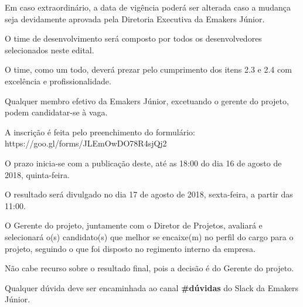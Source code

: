 	\clausula Em caso extraordinário, a data de vigência poderá ser alterada caso a mudança seja devidamente aprovada pela Diretoria Executiva da Emakers Júnior.

	

	\clausula O time de desenvolvimento será composto por todos os desenvolvedores selecionados neste edital.

	\clausula O time, como um todo, deverá prezar pelo cumprimento dos itens 2.3 e 2.4 com excelência e profissionalidade.

	

	\clausula Qualquer membro efetivo da Emakers Júnior, excetuando o gerente do projeto,  podem candidatar-se à vaga.
	
	\clausula A inscrição é feita pelo preenchimento do formulário: 
	https://goo.gl/forms/JLEmOwDO78R4sjQj2

	\clausula O prazo inicia-se com a publicação deste, até as 18:00 do dia 16 de agosto de 2018, quinta-feira.


	\clausula O resultado será divulgado no dia 17 de agosto de 2018, sexta-feira, a partir das 11:00.


	
	\clausula O Gerente do projeto, juntamente com o Diretor de Projetos, avaliará e selecionará o(s) candidato(s) que melhor se encaixe(m) no perfil do cargo para o projeto, seguindo o que foi disposto no regimento interno da empresa.
	
	\clausula Não cabe recurso sobre o resultado final, pois a decisão é do Gerente do projeto.
	
	\clausula Qualquer dúvida deve ser encaminhada ao canal \textbf{\#dúvidas} do Slack da Emakers Júnior.



